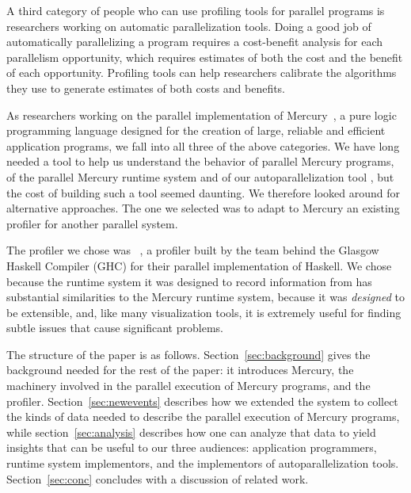 A third category of people who can use profiling tools for parallel programs
is researchers working on automatic parallelization tools.
Doing a good job of automatically parallelizing a program
requires a cost-benefit analysis for each parallelism opportunity,
which requires estimates of both the cost and the benefit of each opportunity.
Profiling tools can help researchers calibrate
the algorithms they use to generate estimates of both costs and benefits.

As researchers working on the parallel implementation of Mercury~\cite{mercury_jlp},
a pure logic programming language designed for
the creation of large, reliable and efficient application programs,
we fall into all three of the above categories.
We have long needed a tool
to help us understand the behavior of parallel Mercury programs,
of the parallel Mercury runtime system
and of our autoparallelization tool \cite{bon-som-tplp-11},
but the cost of building such a tool seemed daunting.
We therefore looked around for alternative approaches.
The one we selected was to adapt to Mercury
an existing profiler for another parallel system.

The profiler we chose was \tscope~\cite{threadscope},
a profiler built by the team behind the Glasgow Haskell Compiler (GHC)
for their parallel implementation of Haskell.
We chose \tscope because
the runtime system it was designed to record information from
has substantial similarities to the Mercury runtime system,
because it was \emph{designed} to be extensible,
and, like many visualization tools, it is extremely useful
for finding subtle issues that cause significant problems.


The structure of the paper is as follows.
Section~\ref{sec:background} gives the background
needed for the rest of the paper:
it introduces Mercury,
the machinery involved in the parallel execution of Mercury programs,
and the \tscope profiler.
Section~\ref{sec:newevents}
describes how we extended the \tscope system
to collect the kinds of data needed to describe
the parallel execution of Mercury programs,
while section~\ref{sec:analysis} describes how
one can analyze that data to yield insights
that can be useful to our three audiences:
application programmers,
runtime system implementors,
and the implementors of autoparallelization tools.
Section~\ref{sec:conc}
concludes with a discussion of related work.

